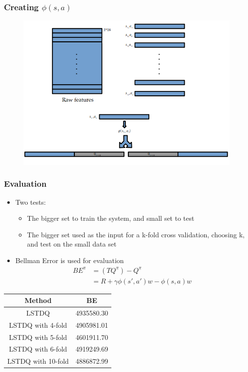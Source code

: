 \documentclass{beamer}
\begin{document}
\begin{frame}
	\frametitle{Creating $\phi(s,a)$}
	\begin{figure}
	  \centering
	  \includegraphics[scale=.40]{phi.png}
	  \label{fig:phi}
	\end{figure}
\end{frame}

\begin{frame}
	\frametitle{Evaluation}
	\begin{itemize}
		\item Two tests:
		\begin{itemize}
			\item The bigger set to train the system, and small set to test
			\item The bigger set used as the input for a k-fold cross validation, choosing k, and test on the small data set
		\end{itemize}
		\item Bellman Error is used for evaluation
		\begin{equation}
		\begin{split}
		 BE^\pi & =(TQ^\pi) - Q^\pi \\
		 & = R + \gamma \phi(s',a') w - \phi(s,a) w 
		\end{split}
		\end{equation}
	\end{itemize}
	\begin{center} \label{tab:be}
	\begin{tabular}{ |c|c| } 
	 \hline
	 Method & BE \\ 
	 \hline
	 LSTDQ & 4935580.30 \\ 
	 LSTDQ with 4-fold & 4905981.01 \\ 
	 LSTDQ with 5-fold & 4601911.70 \\ 
	 LSTDQ with 6-fold & 4919249.69 \\ 
	 LSTDQ with 10-fold& 4886872.99 \\
	 \hline
	\end{tabular}
	\end{center}
\end{frame}
\end{document}
